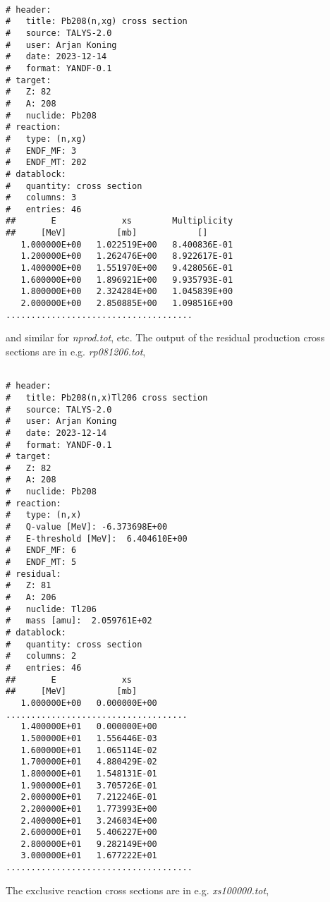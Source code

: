 {\small \begin{verbatim}

# header:
#   title: Pb208(n,xg) cross section
#   source: TALYS-2.0
#   user: Arjan Koning
#   date: 2023-12-14
#   format: YANDF-0.1
# target:
#   Z: 82
#   A: 208
#   nuclide: Pb208
# reaction:
#   type: (n,xg)
#   ENDF_MF: 3
#   ENDF_MT: 202
# datablock:
#   quantity: cross section
#   columns: 3
#   entries: 46
##       E             xs        Multiplicity
##     [MeV]          [mb]            []
   1.000000E+00   1.022519E+00   8.400836E-01
   1.200000E+00   1.262476E+00   8.922617E-01
   1.400000E+00   1.551970E+00   9.428056E-01
   1.600000E+00   1.896921E+00   9.935793E-01
   1.800000E+00   2.324284E+00   1.045839E+00
   2.000000E+00   2.850885E+00   1.098516E+00
.....................................
\end{verbatim} } \renewcommand{\baselinestretch}{1.07}\small\normalsize
\noindent
and similar for {\em nprod.tot}, etc.
The output of the residual production cross sections are in e.g. {\em rp081206.tot},

{\small \begin{verbatim}

# header:
#   title: Pb208(n,x)Tl206 cross section
#   source: TALYS-2.0
#   user: Arjan Koning
#   date: 2023-12-14
#   format: YANDF-0.1
# target:
#   Z: 82
#   A: 208
#   nuclide: Pb208
# reaction:
#   type: (n,x)
#   Q-value [MeV]: -6.373698E+00
#   E-threshold [MeV]:  6.404610E+00
#   ENDF_MF: 6
#   ENDF_MT: 5
# residual:
#   Z: 81
#   A: 206
#   nuclide: Tl206
#   mass [amu]:  2.059761E+02
# datablock:
#   quantity: cross section
#   columns: 2
#   entries: 46
##       E             xs
##     [MeV]          [mb]
   1.000000E+00   0.000000E+00
....................................
   1.400000E+01   0.000000E+00
   1.500000E+01   1.556446E-03
   1.600000E+01   1.065114E-02
   1.700000E+01   4.880429E-02
   1.800000E+01   1.548131E-01
   1.900000E+01   3.705726E-01
   2.000000E+01   7.212246E-01
   2.200000E+01   1.773993E+00
   2.400000E+01   3.246034E+00
   2.600000E+01   5.406227E+00
   2.800000E+01   9.282149E+00
   3.000000E+01   1.677222E+01
.....................................
\end{verbatim} } \renewcommand{\baselinestretch}{1.07}\small\normalsize
\noindent

The exclusive reaction cross sections are in e.g. {\em xs100000.tot}, 

